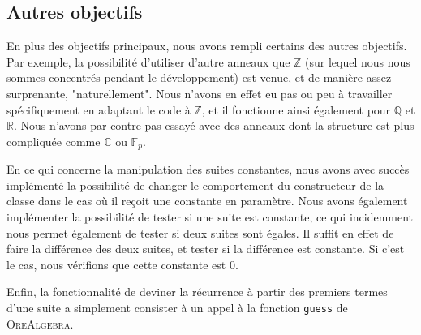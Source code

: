 \documentclass[12pt]{article}
\begin{document}
    \subsection{Autres objectifs}
        En plus des objectifs principaux, nous avons rempli certains des autres objectifs.
        Par exemple, la possibilité d'utiliser d'autre anneaux que $\mathbb Z$ (sur lequel
        nous nous sommes concentrés pendant le développement) est venue, et de manière assez
        surprenante, "naturellement". Nous n'avons en effet eu pas ou peu à travailler
        spécifiquement en adaptant le code à $\mathbb Z$, et il fonctionne ainsi également
        pour $\mathbb Q $ et $\mathbb R $. Nous n'avons par contre pas essayé avec des anneaux
        dont la structure est plus compliquée comme $\mathbb C$ ou $\mathbb F_p$.\\
        \par En ce qui concerne la manipulation des suites constantes, nous avons avec
        succès implémenté la possibilité de changer le comportement du constructeur de la classe
        dans le cas où il reçoit une constante en paramètre. Nous avons également implémenter la
        possibilité de tester si une suite est constante, ce qui incidemment nous permet
        également de tester si deux suites sont égales. Il suffit en effet de faire la différence
        des deux suites, et tester si la différence est constante. Si c'est le cas, nous 
        vérifions que cette constante est 0.\\
        \par Enfin, la fonctionnalité de deviner la récurrence à partir des premiers
        termes d'une suite a simplement consister à un appel à la fonction \texttt{guess}
        de \textsc{OreAlgebra}.

\setcounter{secnumdepth}{0}
\end{document}
